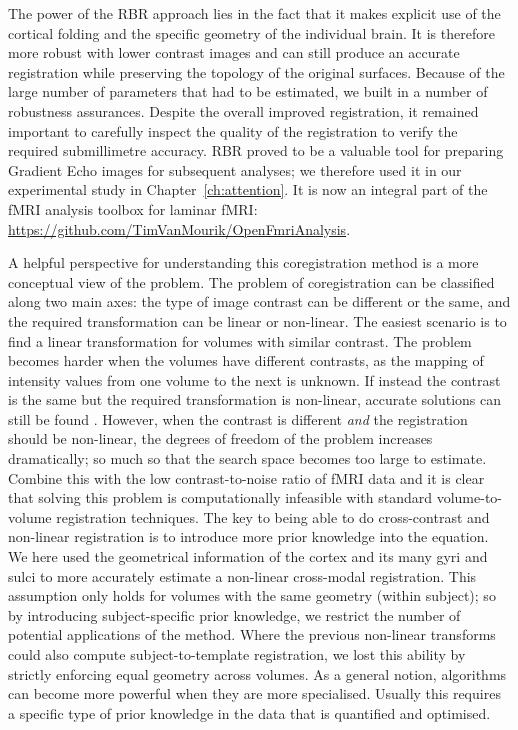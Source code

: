 The power of the RBR approach lies in the fact that it makes explicit use of the cortical folding and the specific geometry of the individual brain. It is therefore more robust with lower contrast images and can still produce an accurate registration while preserving the topology of the original surfaces. Because of the large number of parameters that had to be estimated, we built in a number of robustness assurances. Despite the overall improved registration, it remained important to carefully inspect the quality of the registration to verify the required submillimetre accuracy. RBR proved to be a valuable tool for preparing Gradient Echo images for subsequent analyses; we therefore used it in our experimental study in Chapter~\ref{ch:attention}. It is now an integral part of the fMRI analysis toolbox for laminar fMRI: \url{https://github.com/TimVanMourik/OpenFmriAnalysis}.

A helpful perspective for understanding this coregistration method is a more conceptual view of the problem. The problem of coregistration can be classified along two main axes: the type of image contrast can be different or the same, and the required transformation can be linear or non-linear. The easiest scenario is to find a linear transformation for volumes with similar contrast. The problem becomes harder when the volumes have different contrasts, as the mapping of intensity values from one volume to the next is unknown. If instead the contrast is the same but the required transformation is non-linear, accurate solutions can still be found \cite{Collins1995}. However, when the contrast is different \emph{and} the registration should be non-linear, the degrees of freedom of the problem increases dramatically; so much so that the search space becomes too large to estimate. Combine this with the low contrast-to-noise ratio of fMRI data and it is clear that solving this problem is computationally infeasible with standard volume-to-volume registration techniques. The key to being able to do cross-contrast and non-linear registration is to introduce more prior knowledge into the equation. We here used the geometrical information of the cortex and its many gyri and sulci to more accurately estimate a non-linear cross-modal registration. This assumption only holds for volumes with the same geometry (within subject); so by introducing subject-specific prior knowledge, we restrict the number of potential applications of the method. Where the previous non-linear transforms could also compute subject-to-template registration, we lost this ability by strictly enforcing equal geometry across volumes. As a general notion, algorithms can become more powerful when they are more specialised. Usually this requires a specific type of prior knowledge in the data that is quantified and optimised.

